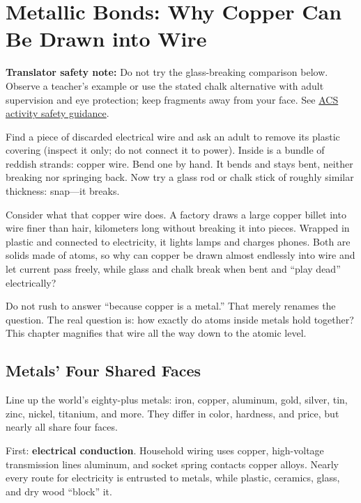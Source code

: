 \chapter{Metallic Bonds: Why Copper Can Be Drawn into Wire}

\begin{kaichang}
\textbf{Translator safety note:} Do not try the glass-breaking comparison below. Observe a teacher's example or use the stated chalk alternative with adult supervision and eye protection; keep fragments away from your face. See \href{https://www.acs.org/education/celebrating-chemistry-editions/2024-ccew/science-safety-tips.html}{ACS activity safety guidance}.

Find a piece of discarded electrical wire and ask an adult to remove its plastic covering (inspect it only; do not connect it to power). Inside is a bundle of reddish strands: copper wire. Bend one by hand. It bends and stays bent, neither breaking nor springing back. Now try a glass rod or chalk stick of roughly similar thickness: snap---it breaks.

Consider what that copper wire does. A factory draws a large copper billet into wire finer than hair, kilometers long without breaking it into pieces. Wrapped in plastic and connected to electricity, it lights lamps and charges phones. Both are solids made of atoms, so why can copper be drawn almost endlessly into wire and let current pass freely, while glass and chalk break when bent and ``play dead'' electrically?

Do not rush to answer ``because copper is a metal.'' That merely renames the question. The real question is: how exactly do atoms inside metals hold together? This chapter magnifies that wire all the way down to the atomic level.
\end{kaichang}

\section{Metals' Four Shared Faces}

Line up the world's eighty-plus metals: iron, copper, aluminum, gold, silver, tin, zinc, nickel, titanium, and more. They differ in color, hardness, and price, but nearly all share four faces.

First: \textbf{electrical conduction}. Household wiring uses copper, high-voltage transmission lines aluminum, and socket spring contacts copper alloys. Nearly every route for electricity is entrusted to metals, while plastic, ceramics, glass, and dry wood ``block'' it.

